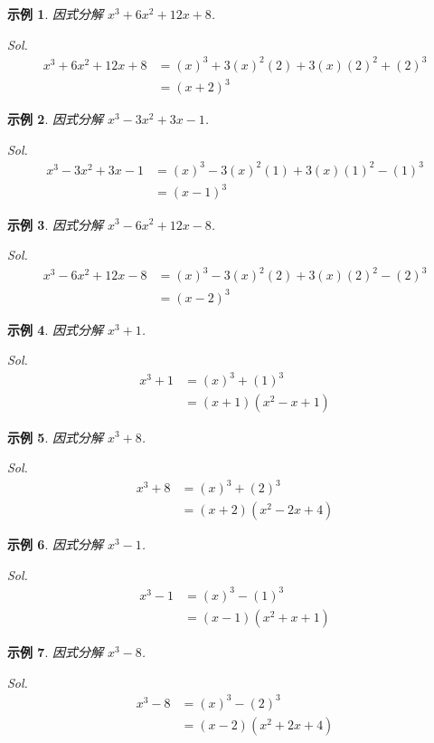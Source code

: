 \documentclass[12pt]{article}
\newtheorem{example}{示例}
\begin{document}
    \begin{example}
        因式分解 $x^3+6x^2+12x+8$.
    \end{example}
    \textit{ Sol. }\begin{align*}
        x^3+6x^2+12x+8&=(x)^3+3(x)^2(2)+3(x)(2)^2+(2)^3\\
        &=(x+2)^3
    \end{align*}

    \begin{example}
        因式分解 $x^3-3x^2+3x-1$.
    \end{example}
    \textit{ Sol. }\begin{align*}
        x^3-3x^2+3x-1&=(x)^3-3(x)^2(1)+3(x)(1)^2-(1)^3\\
        &=(x-1)^3
    \end{align*}

    \begin{example}
        因式分解 $x^3-6x^2+12x-8$.
    \end{example}
    \textit{ Sol. }\begin{align*}
        x^3-6x^2+12x-8&=(x)^3-3(x)^2(2)+3(x)(2)^2-(2)^3\\
        &=(x-2)^3
    \end{align*}

    \begin{example}
        因式分解 $x^3+1$.
    \end{example}
    \textit{ Sol. }\begin{align*}
        x^3+1&=(x)^3+(1)^3\\
        &=(x+1)(x^2-x+1)
    \end{align*}

    \begin{example}
        因式分解 $x^3+8$.
    \end{example}
    \textit{ Sol. }\begin{align*}
        x^3+8&=(x)^3+(2)^3\\
        &=(x+2)(x^2-2x+4)
    \end{align*}

    \begin{example}
        因式分解 $x^3-1$.
    \end{example}
    \textit{ Sol. }\begin{align*}
        x^3-1&=(x)^3-(1)^3\\
        &=(x-1)(x^2+x+1)
    \end{align*}

    \begin{example}
        因式分解 $x^3-8$.
    \end{example}
    \textit{ Sol. }\begin{align*}
        x^3-8&=(x)^3-(2)^3\\
        &=(x-2)(x^2+2x+4)
    \end{align*}
\end{document}
